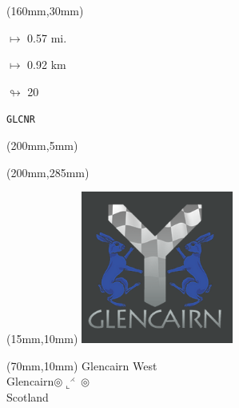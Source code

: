 \begin{textblock*}{40mm}(160mm,30mm)%
\Large
\par$\mapsto$ 0.57 mi.
\par$\mapsto$ 0.92 km
\par$\looparrowright$ 20
\par\hfill\tiny\tt GLCNR\\
\end{textblock*}
\begin{textblock*}{20mm}(200mm,5mm)%
\fbox{\thepage}
\label{GLCNR}
\end{textblock*}
\begin{textblock*}{20mm}(200mm,285mm)%
\fbox{\thepage}
\end{textblock*}

\null\newpage
\begin{textblock*}{50mm}(15mm,10mm)%
\includegraphics[width=50mm]{LG/GLCN.png}
\end{textblock*}
\begin{textblock*}{130mm}(70mm,10mm)%
{\fontsize{20}{20}\selectfont Glencairn West\\}
{\fontsize{16}{16}\selectfont Glencairn\hfill $\circledcirc\llcorner^{\rightthreetimes}\circledcirc$\\}
{\fontsize{12}{12}\selectfont Scotland\\}
\end{textblock*}
